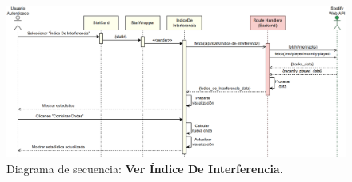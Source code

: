 \begin{figure}[H]
    \centering
    \includegraphics[width=\textwidth]{figures/diagramas_secuencia/ds_ver_indice_de_interferencia.png}
    \caption{Diagrama de secuencia: \textbf{Ver Índice De Interferencia}.}
    \label{fig:ds_ver_indice_de_interferencia}
\end{figure}

